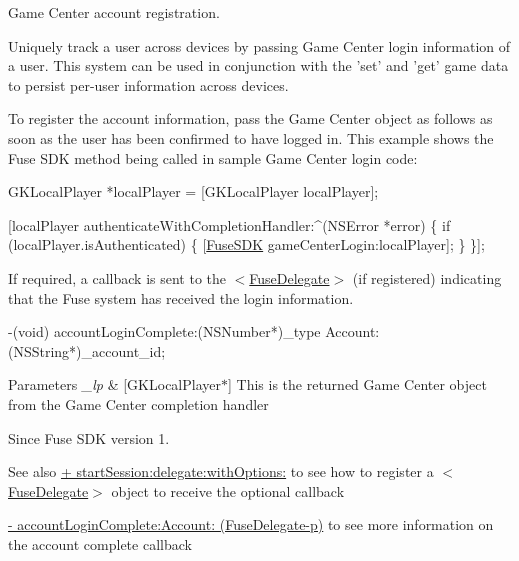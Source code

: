 Game Center account registration. 

Uniquely track a user across devices by passing Game Center login information of a user. This system can be used in conjunction with the 'set' and 'get' game data to persist per-\/user information across devices.

To register the account information, pass the Game Center object as follows as soon as the user has been confirmed to have logged in. This example shows the Fuse S\+D\+K method being called in sample Game Center login code\+:


\begin{DoxyCode}
GKLocalPlayer *localPlayer = [GKLocalPlayer localPlayer];

[localPlayer authenticateWithCompletionHandler:^(NSError *error) 
\{
   \textcolor{keywordflow}{if} (localPlayer.isAuthenticated)
   \{
       [\hyperlink{interface_fuse_s_d_k}{FuseSDK} gameCenterLogin:localPlayer];
   \}
\}];
\end{DoxyCode}


If required, a callback is sent to the $<$\hyperlink{protocol_fuse_delegate-p}{Fuse\+Delegate}$>$ (if registered) indicating that the Fuse system has received the login information.


\begin{DoxyCode}
-(void) accountLoginComplete:(NSNumber*)\_type Account:(NSString*)\_account\_id;
\end{DoxyCode}



\begin{DoxyParams}{Parameters}
{\em \+\_\+lp} & \mbox{[}G\+K\+Local\+Player$\ast$\mbox{]} This is the returned Game Center object from the Game Center completion handler \\
\hline
\end{DoxyParams}
\begin{DoxySince}{Since}
Fuse S\+D\+K version 1. 
\end{DoxySince}
\begin{DoxySeeAlso}{See also}
\hyperlink{interface_fuse_s_d_k_adf7ed64a02b9540c9ded4b931ea4e400}{+ start\+Session\+:delegate\+:with\+Options\+:} to see how to register a $<$\hyperlink{protocol_fuse_delegate-p}{Fuse\+Delegate}$>$ object to receive the optional callback 

\hyperlink{protocol_fuse_delegate-p_a54a18530604a7ceeb0e9419fc7fa3345}{-\/ account\+Login\+Complete\+:\+Account\+: (\+Fuse\+Delegate-\/p)} to see more information on the account complete callback 
\end{DoxySeeAlso}
\hypertarget{interface_fuse_s_d_k_afb8604dccdbf7c0b507074a649b75da9}{}
